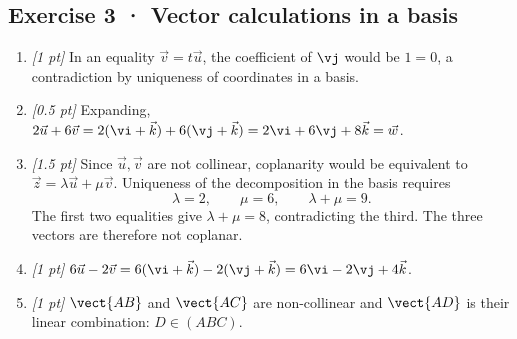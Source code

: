 \subsection*{Exercise 3 · Vector calculations in a basis}\begin{enumerate}

\item \textit{[1 pt]} In an equality $\vec v=t\vec u$, the coefficient of $\vj $ would be $1=0$, a contradiction by uniqueness of coordinates in a basis.

\item \textit{[0.5 pt]} Expanding, $2\vec u+6\vec v=2(\vi +\vec k)+6(\vj +\vec k)=2\vi +6\vj +8\vec k=\vec w$.

\item \textit{[1.5 pt]} Since $\vec u,\vec v$ are not collinear, coplanarity would be equivalent to $\vec z=\lambda\vec u+\mu\vec v$. Uniqueness of the decomposition in the basis requires
\[\lambda=2,\qquad\mu=6,\qquad\lambda+\mu=9.\]
The first two equalities give $\lambda+\mu=8$, contradicting the third. The three vectors are therefore not coplanar.

\item \textit{[1 pt]} $6\vec u-2\vec v=6(\vi +\vec k)-2(\vj +\vec k)=6\vi -2\vj +4\vec k$.

\item \textit{[1 pt]} $\vect{AB}$ and $\vect{AC}$ are non-collinear and $\vect{AD}$ is their linear combination: $D\in(ABC)$.

\end{enumerate}


